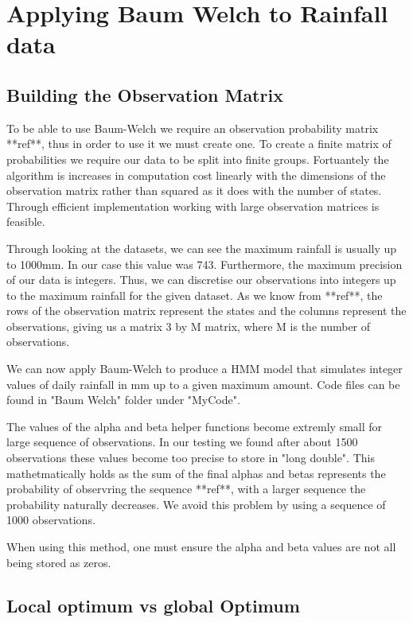 \section{Applying Baum Welch to Rainfall data}

\subsection{Building the Observation Matrix}

To be able to use Baum-Welch we require an observation probability matrix **ref**, thus in order to use it we must create one. To create a finite matrix of probabilities we require our data to be split into finite groups. Fortuantely the algorithm is increases in computation cost linearly with the dimensions of the observation matrix rather than squared as it does with the number of states. Through efficient implementation working with large observation matrices is feasible.

Through looking at the datasets, we can see the maximum rainfall is usually up to 1000mm. In our case this value was 743. Furthermore, the maximum precision of our data is integers. Thus, we can discretise our observations into integers up to the maximum rainfall for the given dataset. As we know from **ref**, the rows of the observation matrix represent the states and the columns represent the observations, giving us a matrix 3 by M matrix, where M is the number of observations.

We can now apply Baum-Welch to produce a HMM model that simulates integer values of daily rainfall in mm up to a given maximum amount. Code files can be found in "Baum Welch" folder under "MyCode". 

\begin{note}
    The values of the alpha and beta helper functions become extremly small for large sequence of observations. In our testing we found after about 1500 observations these values become too precise to store in "long double". This mathetmatically holds as the sum of the final alphas and betas represents the probability of observring the sequence **ref**, with a larger sequence the probability naturally decreases. We avoid this problem by using a sequence of 1000 observations. 
    
    When using this method, one must ensure the alpha and beta values are not all being stored as zeros.
\end{note}


\subsection{Local optimum vs global Optimum}

